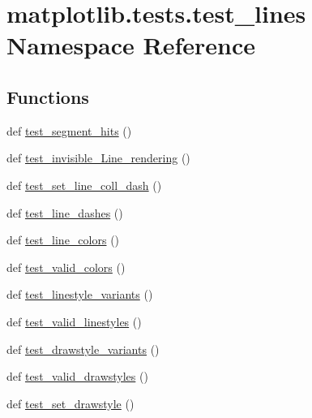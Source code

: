 \hypertarget{namespacematplotlib_1_1tests_1_1test__lines}{}\section{matplotlib.\+tests.\+test\+\_\+lines Namespace Reference}
\label{namespacematplotlib_1_1tests_1_1test__lines}
\subsection*{Functions}
\begin{DoxyCompactItemize}
\item 
def \hyperlink{namespacematplotlib_1_1tests_1_1test__lines_a179a86dc95fd0164656f3921958d4084}{test\+\_\+segment\+\_\+hits} ()
\item 
def \hyperlink{namespacematplotlib_1_1tests_1_1test__lines_adcc15011de6c8e25502c638f43e2160a}{test\+\_\+invisible\+\_\+\+Line\+\_\+rendering} ()
\item 
def \hyperlink{namespacematplotlib_1_1tests_1_1test__lines_a3d4d799e353c37f454688516b5cb399e}{test\+\_\+set\+\_\+line\+\_\+coll\+\_\+dash} ()
\item 
def \hyperlink{namespacematplotlib_1_1tests_1_1test__lines_ab6145c3e218c6fdaf09a470e3a0adf60}{test\+\_\+line\+\_\+dashes} ()
\item 
def \hyperlink{namespacematplotlib_1_1tests_1_1test__lines_a97281087ad321a76ca60f5e3684389ff}{test\+\_\+line\+\_\+colors} ()
\item 
def \hyperlink{namespacematplotlib_1_1tests_1_1test__lines_a460d6f43e7b2e7bb90547dab7a689f01}{test\+\_\+valid\+\_\+colors} ()
\item 
def \hyperlink{namespacematplotlib_1_1tests_1_1test__lines_af6ebbded2a718b5425092526e8a31060}{test\+\_\+linestyle\+\_\+variants} ()
\item 
def \hyperlink{namespacematplotlib_1_1tests_1_1test__lines_a062dc40d2b565c9a0ce5ad539b3e87eb}{test\+\_\+valid\+\_\+linestyles} ()
\item 
def \hyperlink{namespacematplotlib_1_1tests_1_1test__lines_a76207c46df8ba9b99c7e4e91964cf6ff}{test\+\_\+drawstyle\+\_\+variants} ()
\item 
def \hyperlink{namespacematplotlib_1_1tests_1_1test__lines_aae99d7bec1f47aae5e6a22f16fb5f351}{test\+\_\+valid\+\_\+drawstyles} ()
\item 
def \hyperlink{namespacematplotlib_1_1tests_1_1test__lines_a67e3fbaaaf0dd236d0d89977db130678}{test\+\_\+set\+\_\+drawstyle} ()

\end{DoxyCompactItemize}
